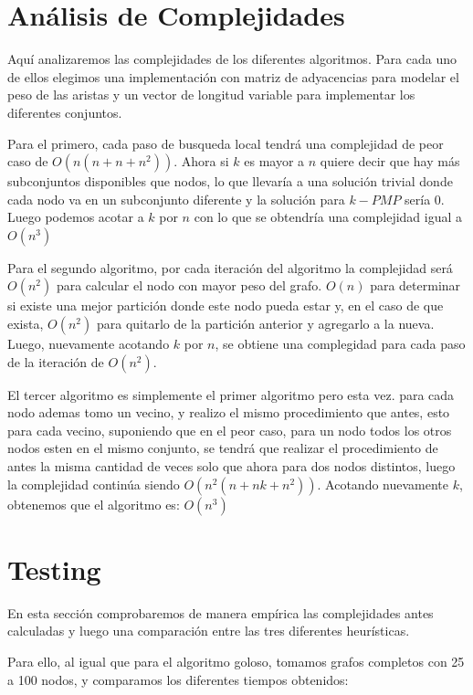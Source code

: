 \newpage

\section{Análisis de Complejidades}

Aquí analizaremos las complejidades de los diferentes algoritmos. Para cada uno de ellos elegimos una implementación con matriz de adyacencias para modelar el peso de las aristas y un vector de longitud variable para implementar los diferentes conjuntos.

Para el primero, cada paso de busqueda local tendrá una complejidad de peor caso de $O(n(n + n + n^2))$. Ahora si $k$ es mayor a $n$ quiere decir que hay más subconjuntos disponibles que nodos, lo que llevaría a una solución trivial donde cada nodo va en un subconjunto diferente y la solución para $k-PMP$ sería 0.
Luego podemos acotar a $k$ por $n$ con lo que se obtendría una complejidad igual a $O(n^3)$

Para el segundo algoritmo, por cada iteración del algoritmo la complejidad será $O(n^2)$ para calcular el nodo con mayor peso del grafo. $O(n)$ para determinar si existe una mejor partición donde este nodo pueda estar y, en el caso de que exista, $O(n^2)$ para quitarlo de la partición anterior y agregarlo a la nueva. Luego, nuevamente acotando $k$ por $n$, se obtiene una complegidad para cada paso de la iteración de $O(n^2)$.

El tercer algoritmo es simplemente el primer algoritmo pero esta vez. para cada nodo ademas tomo un vecino, y realizo el mismo procedimiento que antes, esto para cada vecino, suponiendo que en el peor caso, para un nodo todos los otros nodos esten en el mismo conjunto, se tendrá que realizar el procedimiento de antes la misma cantidad de veces solo que ahora para dos nodos distintos, luego la complejidad continúa siendo $O(n^2 (n + n k + n^2))$. Acotando nuevamente $k$, obtenemos que el algoritmo es: $O(n^3)$

\section{Testing}

En esta sección comprobaremos de manera empírica las complejidades antes calculadas y luego una comparación entre las tres diferentes heurísticas.

Para ello, al igual que para el algoritmo goloso, tomamos grafos completos con 25 a 100 nodos, y comparamos los diferentes tiempos obtenidos:

